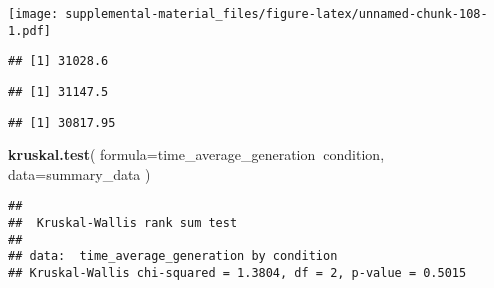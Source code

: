 \documentclass[]{book}
\newenvironment{Shaded}{\begin{snugshade}}{\end{snugshade}}
\newcommand{\DataTypeTok}[1]{\textcolor[rgb]{0.13,0.29,0.53}{#1}}
\newcommand{\KeywordTok}[1]{\textcolor[rgb]{0.13,0.29,0.53}{\textbf{#1}}}
\newcommand{\NormalTok}[1]{#1}
\newcommand{\OperatorTok}[1]{\textcolor[rgb]{0.81,0.36,0.00}{\textbf{#1}}}
\newcommand{\StringTok}[1]{\textcolor[rgb]{0.31,0.60,0.02}{#1}}
\begin{document}
\texttt{[image: supplemental-material\_files/figure-latex/unnamed-chunk-108-1.pdf]}

\begin{Shaded}
\end{Shaded}

\begin{verbatim}
## [1] 31028.6
\end{verbatim}

\begin{Shaded}
\end{Shaded}

\begin{verbatim}
## [1] 31147.5
\end{verbatim}

\begin{Shaded}
\end{Shaded}

\begin{verbatim}
## [1] 30817.95
\end{verbatim}

\begin{Shaded}
\begin{Highlighting}[]
\KeywordTok{kruskal.test}\NormalTok{(}
  \DataTypeTok{formula=}\NormalTok{time_average_generation}\OperatorTok{~}\NormalTok{condition,}
  \DataTypeTok{data=}\NormalTok{summary_data}
\NormalTok{)}
\end{Highlighting}
\end{Shaded}

\begin{verbatim}
## 
##  Kruskal-Wallis rank sum test
## 
## data:  time_average_generation by condition
## Kruskal-Wallis chi-squared = 1.3804, df = 2, p-value = 0.5015
\end{verbatim}
\end{document}
